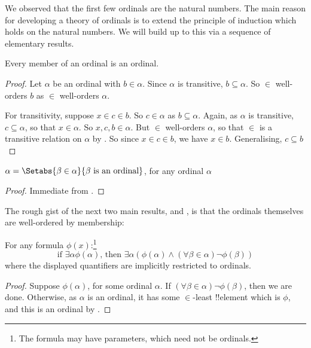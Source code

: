\documentclass[../../../include/open-logic-section]{subfiles}
\begin{document}
We observed that the first few ordinals are the natural numbers. The main reason for developing a theory of ordinals is to extend the principle of induction which holds on the natural numbers. We will build up to this via a sequence of elementary results.
\begin{lem} Every member of an ordinal is an ordinal.
\end{lem}
\begin{proof}
	Let $\alpha$ be an ordinal with $b \in \alpha$. Since $\alpha$ is transitive, $b \subseteq \alpha$. So $\in$ well-orders $b$ as $\in$ well-orders $\alpha$.
		
	For transitivity, suppose $x \in c \in b$. So $c \in \alpha$ as $b \subseteq \alpha$. Again, as $\alpha$ is transitive, $c \subseteq \alpha$, so that $x \in \alpha$. So $x, c, b \in \alpha$. But $\in$ well-orders $\alpha$, so that $\in$ is a transitive relation on $\alpha$ by . So since $x \in c \in b$, we have $x \in b$. Generalising, $c \subseteq b$
\end{proof}
\begin{cor}
	 $\alpha = \Setabs{\beta \in \alpha}{\beta \text{ is an ordinal}}$, for any ordinal $\alpha$
\end{cor}
\begin{proof}
	Immediate from .
\end{proof}\noindent
The rough gist of the next two main results,  and , is that the ordinals themselves are well-ordered by membership:
\begin{thm} For any formula $\phi(x)$:\footnote{The formula may have parameters, which need not be ordinals.} 	
		$$\text{if }\exists \alpha \phi(\alpha)\text{, then }\exists \alpha(\phi(\alpha) \land  (\forall \beta \in \alpha) \lnot \phi(\beta))$$
where the displayed quantifiers are implicitly restricted to ordinals.
\end{thm}
\begin{proof}
	Suppose $\phi(\alpha)$, for some ordinal $\alpha$. If $ (\forall \beta \in \alpha) \lnot \phi(\beta)$, then we are done. Otherwise, as $\alpha$ is an ordinal, it has some $\in$-least !!{element} which is $\phi$, and this is an ordinal by .
\end{proof}\noindent
\end{document}

